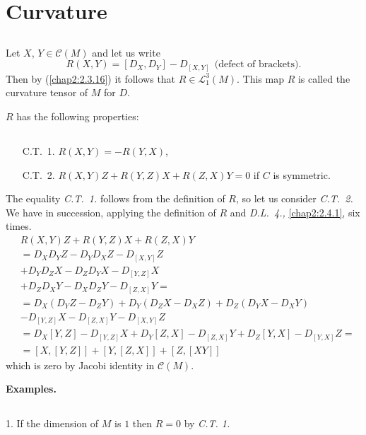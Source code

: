 \section{Curvature}\label{chap2:sec5}

\subsection{}\label{chap2:2.5.1}
Let $X$, $Y\in \mathscr{C}(M)$ and let us write
$$
R(X,Y)=[D_{X},D_{Y}]-D_{[X,Y]} \ \ \text{(defect of brackets).}
$$
Then \pageoriginale by (\ref{chap2:2.3.16}) it follows that $R\in
\mathscr{L}^{3}_{1}(M)$. This map $R$ is called the curvature tensor
of $M$ for $D$.

$R$ has the following properties:

\setcounter{subsection}{1}
\subsection{}\label{chap2:2.5.2}

\begin{itemize}
\item[C.T.~1.] $R(X,Y)=-R(Y,X)$,

\item[C.T.~2.] $R(X,Y)Z+R(Y,Z)X+R(Z,X)Y=0$ if $C$ is symmetric.
\end{itemize}
The equality {\em C.T.~1.} follows from the definition of $R$, so let
us consider {\em C.T.~2.} We have in succession, applying the
definition of $R$ and {\em D.L.~4.,} \ref{chap2:2.4.1}, six times.
\begin{align*}
& R(X,Y)Z+R(Y,Z)X+R(Z,X)Y\\
& = D_{X}D_{Y}Z-D_{Y}D_{X}Z-D_{[X,Y]}Z\\
& +D_{Y}D_{Z}X-D_{Z}D_{Y}X-D_{[Y,Z]}X\\
& +D_{Z}D_{X}Y-D_{X}D_{Z}Y-D_{[Z,X]}Y=\\
& =D_{X}(D_{Y}Z-D_{Z}Y)+D_{Y}(D_{Z}X-D_{X}Z)+D_{Z}(D_{Y}X-D_{X}Y)\\
& - D_{[Y,Z]}X-D_{[Z,X]}Y-D_{[X,Y]}Z\\
&=
  D_{X}[Y,Z]-D_{[Y,Z]}X+D_{Y}[Z,X]-D_{[Z,X]}Y+D_{Z}[Y,X]-D_{[Y,X]}Z=\\
&= [X,[Y,Z]]+[Y,[Z,X]]+[Z,[XY]]
\end{align*}
which is zero by Jacobi identity in $\mathscr{C}(M)$.

\medskip
\noindent
{\bf Examples.}


\subsection{}\label{chap2:2.5.3} 
1. If the dimension of $M$ is $1$ then
  $R=0$ by {\em  C.T. 1.}


